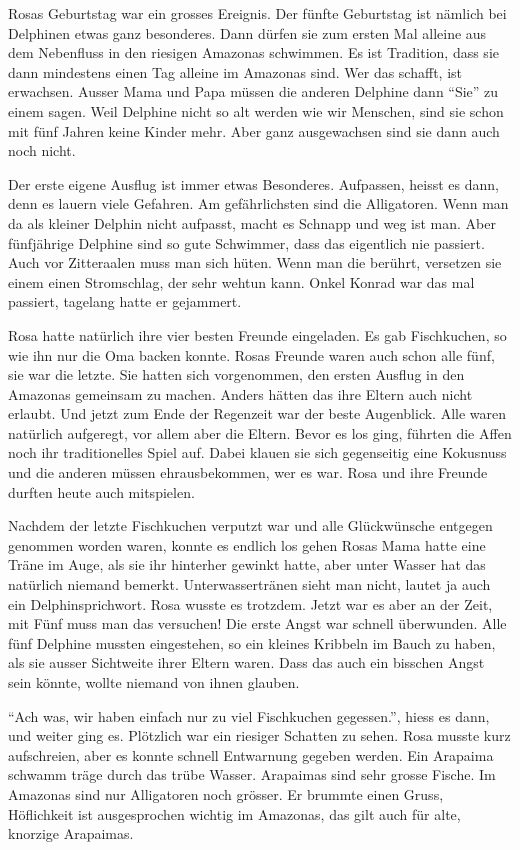 Rosas Geburtstag war ein grosses Ereignis. Der fünfte Geburtstag ist nämlich bei Delphinen etwas ganz besonderes. Dann dürfen sie zum ersten Mal alleine aus dem Nebenfluss in den riesigen Amazonas schwimmen. Es ist Tradition, dass sie dann mindestens einen Tag alleine im Amazonas sind. Wer das schafft, ist erwachsen. Ausser Mama und Papa müssen die anderen Delphine dann \enquote{Sie} zu einem sagen. Weil Delphine nicht so alt werden wie wir Menschen, sind sie schon mit fünf Jahren keine Kinder mehr. Aber ganz ausgewachsen sind sie dann auch noch nicht.

Der erste eigene Ausflug ist immer etwas Besonderes. Aufpassen, heisst es dann, denn es lauern viele Gefahren. Am gefährlichsten sind die Alligatoren. Wenn man da als kleiner Delphin nicht aufpasst, macht es Schnapp und weg ist man. Aber fünfjährige Delphine sind so gute Schwimmer, dass das eigentlich nie passiert. Auch vor Zitteraalen muss man sich hüten. Wenn man die berührt, versetzen sie einem einen Stromschlag, der sehr wehtun kann. Onkel Konrad war das mal passiert, tagelang hatte er gejammert.

Rosa hatte natürlich ihre vier besten Freunde eingeladen. Es gab Fischkuchen, so wie ihn nur die Oma backen konnte. Rosas Freunde waren auch schon alle fünf, sie war die letzte. Sie hatten sich vorgenommen, den ersten Ausflug in den Amazonas gemeinsam zu machen. Anders hätten das ihre Eltern auch nicht erlaubt. Und jetzt zum Ende der Regenzeit war der beste Augenblick. Alle waren natürlich aufgeregt, vor allem aber die Eltern. Bevor es los ging, führten die Affen noch ihr traditionelles Spiel auf. Dabei klauen sie sich gegenseitig eine Kokusnuss und die anderen müssen ehrausbekommen, wer es war. Rosa und ihre Freunde durften heute auch mitspielen.

Nachdem der letzte Fischkuchen verputzt war und alle Glückwünsche entgegen genommen worden waren, konnte es endlich los gehen Rosas Mama hatte eine Träne im Auge, als sie ihr hinterher gewinkt hatte, aber unter Wasser hat das natürlich niemand bemerkt. Unterwassertränen sieht man nicht, lautet ja auch ein Delphinsprichwort. Rosa wusste es trotzdem. Jetzt war es aber an der Zeit, mit Fünf muss man das versuchen! Die erste Angst war schnell überwunden. Alle fünf Delphine mussten eingestehen, so ein kleines Kribbeln im Bauch zu haben, als sie ausser Sichtweite ihrer Eltern waren. Dass das auch ein bisschen Angst sein könnte, wollte niemand von ihnen glauben.

\enquote{Ach was, wir haben einfach nur zu viel Fischkuchen gegessen.}, hiess es dann, und weiter ging es. Plötzlich war ein riesiger Schatten zu sehen. Rosa musste kurz aufschreien, aber es konnte schnell Entwarnung gegeben werden. Ein Arapaima schwamm träge durch das trübe Wasser. Arapaimas sind sehr grosse Fische. Im Amazonas sind nur Alligatoren noch grösser. Er brummte einen Gruss, Höflichkeit ist ausgesprochen wichtig im Amazonas, das gilt auch für alte, knorzige Arapaimas.


